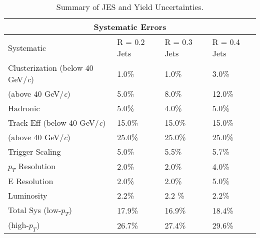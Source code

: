 \begin{table}[h!]
\centering
\caption{Summary of JES and Yield Uncertainties.}
\begin{tabular}{ |p{5cm}||p{3cm}|p{3cm}|p{3cm}|  }
 \hline
 \multicolumn{4}{|c|}{Systematic Errors} \\
 \hline
 Systematic &R = 0.2 Jets & R = 0.3 Jets& R = 0.4 Jets\\
 \hline
Clusterization (below 40 GeV/\textit{c}) & 1.0\%    &1.0\%&  3.0\%\\
 (above 40 GeV/\textit{c})           &  5.0\%  & 8.0\%   &  12.0\%\\
Hadronic &   5.0\% & 4.0\% & 5.0\%\\
Track Eff (below 40 GeV/\textit{c})&15.0\% & 15.0\% & 15.0\%\\
 (above 40 GeV/\textit{c})            &  25.0\%  & 25.0\%   &  25.0\%\\
Trigger Scaling & 5.0\% & 5.5\%&  5.7\%\\
$p_{T}$ Resolution & 2.0\% & 2.0\% & 4.0\%\\
E Resolution& 2.0\%   &2.0\% & 5.0\%\\
Luminosity & 2.2\%  & 2.2 \% & 2.2\%\\
 \hline
 \hline
Total Sys (low-$p_{T}$) & 17.9\%  & 16.9\% & 18.4\%\\
(high-$p_{T}$) & 26.7\%  & 27.4\% & 29.6\%\\
\hline
\end{tabular}

\label{table:1}
\end{table}


